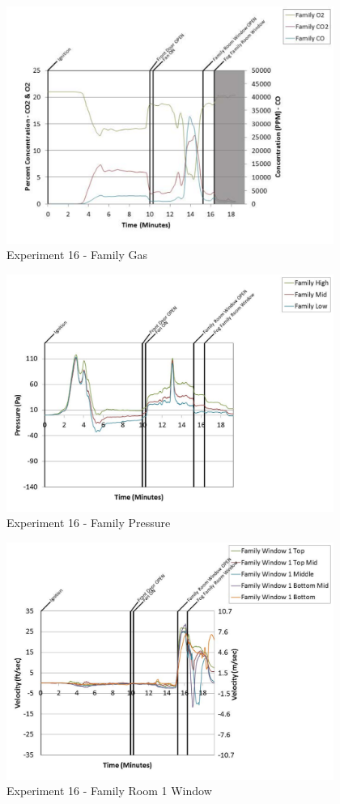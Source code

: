 \documentclass{article}
\begin{document}
\begin{appendices}
	\begin{figure}[h!]
		\centering
		\includegraphics[height=3.05in]{0_Images/Results_Charts/Exp_16_Charts/FamilyGas.pdf}
		\caption{Experiment 16 - Family Gas}
	\end{figure}
 
	\clearpage

	\begin{figure}[h!]
		\centering
		\includegraphics[height=3.05in]{0_Images/Results_Charts/Exp_16_Charts/FamilyPressure.pdf}
		\caption{Experiment 16 - Family Pressure}
	\end{figure}
 

	\begin{figure}[h!]
		\centering
		\includegraphics[height=3.05in]{0_Images/Results_Charts/Exp_16_Charts/FamilyRoom1Window.pdf}
		\caption{Experiment 16 - Family Room 1 Window}
	\end{figure}
 

\end{appendices}
\end{document}
